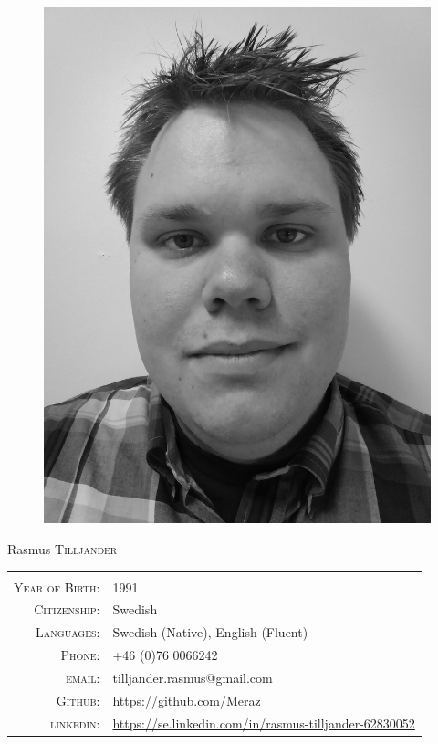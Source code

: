 \documentclass[a4paper, 11pt]{article}
\begin{document}
\pagestyle{empty} %

\par{	
    \begin{figure}
    \includegraphics[scale=0.10]{rt050.png}
    \end{figure}
    
    \Huge Rasmus \textsc{Tilljander}
    
\par}


\begin{tabular}{rl}
    \textsc{} &    \\
    \textsc{Year of Birth:} &   1991   \\
    \textsc{Citizenship:}   &   Swedish \\ 
    \textsc{Languages:}  & Swedish (Native), English (Fluent) \\
    \textsc{Phone:}     & +46 (0)76 0066242\\
    \textsc{email:}     & tilljander.rasmus@gmail.com\\
    \textsc{Github:}  & \url{https://github.com/Meraz}\\
    \textsc{linkedin:}  & \url{https://se.linkedin.com/in/rasmus-tilljander-62830052}
\end{tabular}
\end{document}

